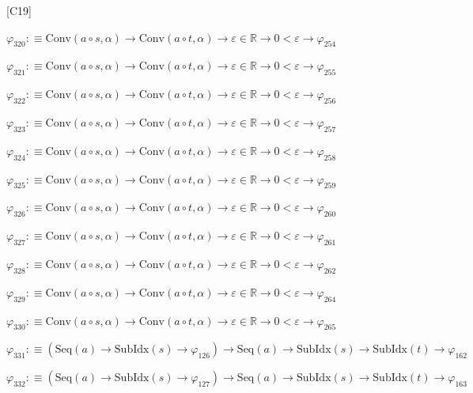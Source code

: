 \begin{fullproof}{[C19]}
\begin{abbrevlist}
\item $\varphi_{320} :\equiv \mathrm{Conv}(a \circ s,\alpha) \to \mathrm{Conv}(a \circ t,\alpha) \to \varepsilon \in \mathbb{R} \to 0 < \varepsilon \to \varphi_{254}$
\item $\varphi_{321} :\equiv \mathrm{Conv}(a \circ s,\alpha) \to \mathrm{Conv}(a \circ t,\alpha) \to \varepsilon \in \mathbb{R} \to 0 < \varepsilon \to \varphi_{255}$
\item $\varphi_{322} :\equiv \mathrm{Conv}(a \circ s,\alpha) \to \mathrm{Conv}(a \circ t,\alpha) \to \varepsilon \in \mathbb{R} \to 0 < \varepsilon \to \varphi_{256}$
\item $\varphi_{323} :\equiv \mathrm{Conv}(a \circ s,\alpha) \to \mathrm{Conv}(a \circ t,\alpha) \to \varepsilon \in \mathbb{R} \to 0 < \varepsilon \to \varphi_{257}$
\item $\varphi_{324} :\equiv \mathrm{Conv}(a \circ s,\alpha) \to \mathrm{Conv}(a \circ t,\alpha) \to \varepsilon \in \mathbb{R} \to 0 < \varepsilon \to \varphi_{258}$
\item $\varphi_{325} :\equiv \mathrm{Conv}(a \circ s,\alpha) \to \mathrm{Conv}(a \circ t,\alpha) \to \varepsilon \in \mathbb{R} \to 0 < \varepsilon \to \varphi_{259}$
\item $\varphi_{326} :\equiv \mathrm{Conv}(a \circ s,\alpha) \to \mathrm{Conv}(a \circ t,\alpha) \to \varepsilon \in \mathbb{R} \to 0 < \varepsilon \to \varphi_{260}$
\item $\varphi_{327} :\equiv \mathrm{Conv}(a \circ s,\alpha) \to \mathrm{Conv}(a \circ t,\alpha) \to \varepsilon \in \mathbb{R} \to 0 < \varepsilon \to \varphi_{261}$
\item $\varphi_{328} :\equiv \mathrm{Conv}(a \circ s,\alpha) \to \mathrm{Conv}(a \circ t,\alpha) \to \varepsilon \in \mathbb{R} \to 0 < \varepsilon \to \varphi_{262}$
\item $\varphi_{329} :\equiv \mathrm{Conv}(a \circ s,\alpha) \to \mathrm{Conv}(a \circ t,\alpha) \to \varepsilon \in \mathbb{R} \to 0 < \varepsilon \to \varphi_{264}$
\item $\varphi_{330} :\equiv \mathrm{Conv}(a \circ s,\alpha) \to \mathrm{Conv}(a \circ t,\alpha) \to \varepsilon \in \mathbb{R} \to 0 < \varepsilon \to \varphi_{265}$
\item $\varphi_{331} :\equiv (\mathrm{Seq}(a) \to \mathrm{SubIdx}(s) \to \varphi_{126}) \to \mathrm{Seq}(a) \to \mathrm{SubIdx}(s) \to \mathrm{SubIdx}(t) \to \varphi_{162}$
\item $\varphi_{332} :\equiv (\mathrm{Seq}(a) \to \mathrm{SubIdx}(s) \to \varphi_{127}) \to \mathrm{Seq}(a) \to \mathrm{SubIdx}(s) \to \mathrm{SubIdx}(t) \to \varphi_{163}$

\end{abbrevlist}
\end{fullproof}
